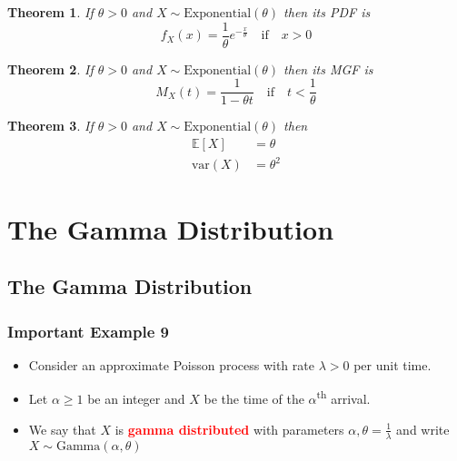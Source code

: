 \documentclass{article}
\newcommand{\E}{\mathbb{E}}
\newcommand{\var}{\text{var}}
\newcommand{\bfred}[1]{\textcolor{red}{\textbf{#1}}}
\theoremstyle{plain}
\newtheorem{thm}{Theorem}[section]
\theoremstyle{definition}
\theoremstyle{remark}
\begin{document}
\begin{thm}
    If $\theta>0$ and $X\sim\text{Exponential}(\theta)$ then its PDF is \[f_X(x)=\frac{1}{\theta}e^{-\frac{x}{\theta}} \quad \text{if} \quad x>0\]
\end{thm}

\begin{thm}
    If $\theta>0$ and $X\sim\text{Exponential}(\theta)$ then its MGF is \[M_X(t)=\frac{1}{1-\theta t} \quad \text{if} \quad t<\frac{1}{\theta}\]
\end{thm}

\begin{thm}
    If $\theta>0$ and $X\sim\text{Exponential}(\theta)$ then
    \begin{align*}
        \E[X]&=\theta\\
        \var(X)&=\theta^2
    \end{align*}
\end{thm}

\section{The Gamma Distribution}

\subsection{The Gamma Distribution}

\subsubsection*{Important Example 9}

\begin{tcolorbox}[title = Gamma Distribution, colback = SkyBlue!5!white,colframe = SkyBlue!75!black]
    \begin{itemize}
        \item Consider an approximate Poisson process with rate $\lambda>0$ per unit time.
        \item Let $\alpha\geq1$ be an integer and $X$ be the time of the $\alpha$\textsuperscript{th} arrival.
        \item We say that $X$ is \bfred{gamma distributed} with parameters $\alpha, \theta=\frac{1}{\lambda}$ and write $X\sim\text{Gamma}(\alpha,\theta)$
    \end{itemize}
\end{tcolorbox}
\end{document}
